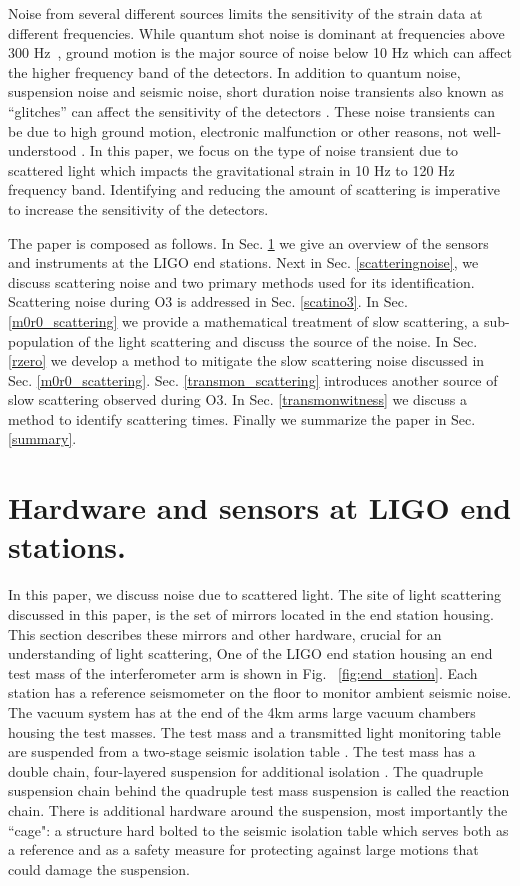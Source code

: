 \documentclass[12pt]{iopart}
\begin{document}
Noise from several different sources limits the sensitivity of the strain data at different frequencies. 
While quantum shot noise is dominant at frequencies above 300 Hz~\cite{tjthesis}, ground motion is the major source of noise below 10 Hz which can affect the higher frequency band of the detectors. In addition to quantum noise, suspension noise and seismic noise, short duration noise transients also known as ``glitches'' can affect the sensitivity of the detectors \cite{transientpaper}. These noise transients can be due to high ground motion, electronic malfunction or other reasons, not well-understood \cite{Nuttall_2018,noisepaper,Cabero_2019}. In this paper, we focus on the type of noise transient due to scattered light which impacts the gravitational strain in 10 Hz to 120 Hz frequency band. Identifying and reducing the amount of scattering is imperative to increase the sensitivity of the detectors. 
 
The paper is composed as follows. In Sec. \ref{hardware} we give an overview of the sensors and instruments at the LIGO end stations. Next in Sec. \ref{scatteringnoise}, we discuss scattering noise and two primary methods used for its identification. Scattering noise during O3 is addressed in Sec. \ref{scatino3}. In Sec. \ref{m0r0_scattering} we provide a mathematical treatment of slow scattering, a sub-population of the light scattering and discuss the source of the noise. In Sec. \ref{rzero} we develop a method to mitigate the slow scattering noise discussed in Sec. \ref{m0r0_scattering}. Sec. \ref{transmon_scattering} introduces another source of slow scattering observed during O3. In Sec. \ref{transmonwitness} we discuss a method to identify scattering times. Finally we summarize the paper in Sec. \ref{summary}. 

\section{Hardware and sensors at LIGO end stations.}\label{hardware} In this paper, we discuss noise due to scattered light. The site of light scattering discussed in this paper, is the set of mirrors located in the end station housing. This section describes these mirrors and other hardware, crucial for an understanding of light scattering,
One of the LIGO end station housing an end test mass \cite{ETM_ref} of the interferometer arm is shown in Fig. ~\ref{fig:end_station}. Each station has a reference seismometer on the floor to monitor ambient seismic noise. The vacuum system has at the end of the 4km arms large vacuum chambers housing the test masses. The test mass and a transmitted light monitoring table are suspended from a two-stage seismic isolation table \cite{Matichard_2015}. The test mass has a double chain, four-layered suspension for additional isolation \cite{Aston_2012}. The quadruple suspension chain behind the quadruple test mass suspension is called the reaction chain. There is additional hardware around the suspension, most importantly the ``cage": a structure hard bolted to the seismic isolation table which serves both as a reference and as a safety measure for protecting against large motions that could damage the suspension.
\end{document}
